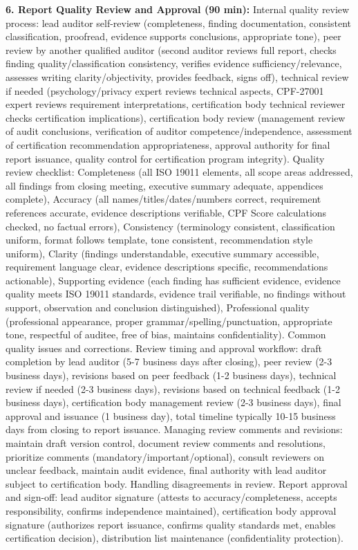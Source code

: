 \documentclass[11pt,a4paper]{article}
\begin{document}
\textbf{6. Report Quality Review and Approval (90 min):} Internal quality review process: lead auditor self-review (completeness, finding documentation, consistent classification, proofread, evidence supports conclusions, appropriate tone), peer review by another qualified auditor (second auditor reviews full report, checks finding quality/classification consistency, verifies evidence sufficiency/relevance, assesses writing clarity/objectivity, provides feedback, signs off), technical review if needed (psychology/privacy expert reviews technical aspects, CPF-27001 expert reviews requirement interpretations, certification body technical reviewer checks certification implications), certification body review (management review of audit conclusions, verification of auditor competence/independence, assessment of certification recommendation appropriateness, approval authority for final report issuance, quality control for certification program integrity). Quality review checklist: Completeness (all ISO 19011 elements, all scope areas addressed, all findings from closing meeting, executive summary adequate, appendices complete), Accuracy (all names/titles/dates/numbers correct, requirement references accurate, evidence descriptions verifiable, CPF Score calculations checked, no factual errors), Consistency (terminology consistent, classification uniform, format follows template, tone consistent, recommendation style uniform), Clarity (findings understandable, executive summary accessible, requirement language clear, evidence descriptions specific, recommendations actionable), Supporting evidence (each finding has sufficient evidence, evidence quality meets ISO 19011 standards, evidence trail verifiable, no findings without support, observation and conclusion distinguished), Professional quality (professional appearance, proper grammar/spelling/punctuation, appropriate tone, respectful of auditee, free of bias, maintains confidentiality). Common quality issues and corrections. Review timing and approval workflow: draft completion by lead auditor (5-7 business days after closing), peer review (2-3 business days), revisions based on peer feedback (1-2 business days), technical review if needed (2-3 business days), revisions based on technical feedback (1-2 business days), certification body management review (2-3 business days), final approval and issuance (1 business day), total timeline typically 10-15 business days from closing to report issuance. Managing review comments and revisions: maintain draft version control, document review comments and resolutions, prioritize comments (mandatory/important/optional), consult reviewers on unclear feedback, maintain audit evidence, final authority with lead auditor subject to certification body. Handling disagreements in review. Report approval and sign-off: lead auditor signature (attests to accuracy/completeness, accepts responsibility, confirms independence maintained), certification body approval signature (authorizes report issuance, confirms quality standards met, enables certification decision), distribution list maintenance (confidentiality protection).
\end{document}
